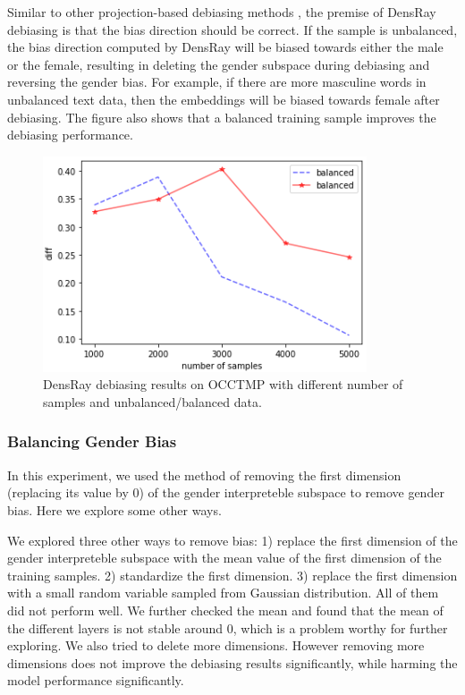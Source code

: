 Similar to other projection-based debiasing methods
\cite{bolukbasi2016man,zhao2019gender,dev2019attenuating}, the premise of DensRay debiasing is
that the bias direction should be correct. If the sample is
unbalanced, the bias direction computed by DensRay will be
biased towards either the male or the female, resulting in
deleting the gender subspace during debiasing and reversing
the gender bias. For example, if there are more masculine words in
unbalanced text data, then the embeddings will be biased
towards female after debiasing. The figure also shows that
a balanced training sample improves the debiasing
performance.
\begin{figure}[h]
	\centering
	\includegraphics[width=0.5\linewidth]{samples}
	\caption{DensRay debiasing results on OCCTMP with different number of samples and unbalanced/balanced data.}
\end{figure}

\subsubsection{Balancing Gender Bias}
In this experiment, we used the method of removing the first dimension (replacing its value by $0$) of the gender interpreteble subspace to remove gender bias. Here we explore some other ways.

We explored three other ways to remove bias: 1) replace the first dimension of the gender interpreteble subspace with the mean value of the first dimension of the training samples. 2) standardize the first dimension. 3) replace the first dimension with a small random variable sampled from Gaussian distribution. All of them did not perform well. We further checked the mean and found that the mean of the different layers is not stable around 0, which is a problem worthy for further exploring. We also tried to delete more dimensions. However removing more dimensions does not improve the debiasing results significantly, while harming the model performance significantly.


